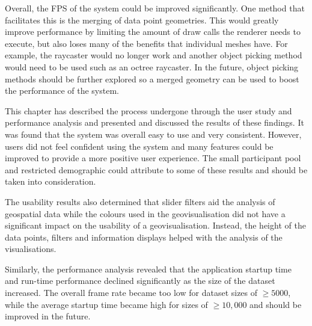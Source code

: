 {{		Overall, the FPS of the system could be improved significantly. One method that facilitates this is the merging of data point geometries. This would greatly improve performance by limiting the amount of draw calls the renderer needs to execute, but also loses many of the benefits that individual meshes have. For example, the raycaster would no longer work and another object picking method would need to be used such as an octree raycaster. In the future, object picking methods should be further explored so a merged geometry can be used to boost the performance of the system.

	}

}

This chapter has described the process undergone through the user study and performance analysis and presented and discussed the results of these findings. It was found that the system was overall easy to use and very consistent. However, users did not feel confident using the system and many features could be improved to provide a more positive user experience. The small participant pool and restricted demographic could attribute to some of these results and should be taken into consideration. 

The usability results also determined that slider filters aid the analysis of geospatial data while the colours used in the geovisualisation did not have a significant impact on the usability of a geovisualisation. Instead, the height of the data points, filters and information displays helped with the analysis of the visualisations. 

Similarly, the performance analysis revealed that the application startup time and run-time performance declined significantly as the size of the dataset increased. The overall frame rate became too low for dataset sizes of $\geqslant5000$, while the average startup time became high for sizes of $\geqslant10, 000$ and should be improved in the future.
